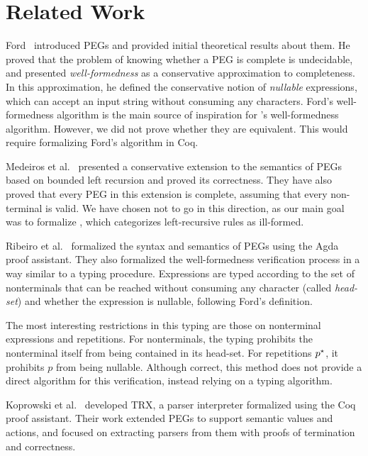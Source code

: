 \chapter{Related Work}
\label{chapter:related-work}

Ford~\cite{ford_parsing_2004} introduced PEGs
and provided initial theoretical results about them.
He proved that the problem of knowing whether
a PEG is complete is undecidable,
and presented \emph{well-formedness}
as a conservative approximation to completeness.
In this approximation,
he defined the conservative notion of \emph{nullable} expressions,
which can accept an input string without consuming any characters.
Ford's well-formedness algorithm
is the main source of inspiration for \lpeg{}'s well-formedness algorithm.
However, we did not prove whether they are equivalent.
This would require formalizing Ford's algorithm in Coq.

Medeiros et al.~\cite{medeiros_left_2014}
presented a conservative extension to the semantics of PEGs
based on bounded left recursion and proved its correctness.
They have also proved that every PEG in this extension
is complete, assuming that every non-terminal is valid.
We have chosen not to go in this direction,
as our main goal was to formalize \lpeg{},
which categorizes left-recursive rules as ill-formed.

Ribeiro et al.~\cite{ribeiro_towards_2019}
formalized the syntax and semantics of PEGs
using the Agda proof assistant.
They also formalized the well-formedness verification process
in a way similar to a typing procedure.
Expressions are typed according to the set of nonterminals that can
be reached without consuming any character
(called \emph{head-set})
and whether the expression is nullable,
following Ford's definition.

The most interesting restrictions in this typing
are those on nonterminal expressions and repetitions.
For nonterminals, the typing
prohibits the nonterminal itself from being contained in its head-set.
For repetitions $p^\star$, it prohibits $p$ from being nullable.
Although correct, this method does not provide a direct algorithm for this verification, instead relying on a typing algorithm.

Koprowski et al.~\cite{koprowski_trx_2011} developed TRX,
a parser interpreter formalized using the Coq proof assistant.
Their work extended PEGs to support semantic values and actions,
and focused on extracting parsers from them
with proofs of termination and correctness.

